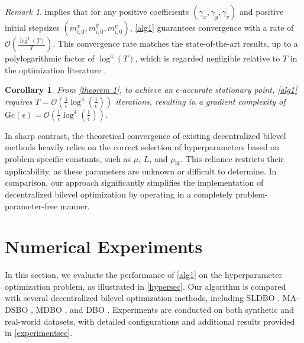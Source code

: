 \documentclass{article}
\theoremstyle{plain}
\newtheorem{corollary}[corollary]{Corollary}
\theoremstyle{definition}
\theoremstyle{remark}
\newtheorem{remark}[remark]{Remark}
\begin{document}
\begin{remark}
 implies that for any positive coefficients \((\gamma_x, \gamma_y, \gamma_v)\) and positive initial stepsizes \((m^x_{i,0}, m^y_{i,0}, m^v_{i,0})\), \cref{alg1} guarantees convergence with a rate of \(\mathcal{O}\left(\frac{\log^4(T)}{T}\right)\). This convergence rate matches the state-of-the-art results, up to a polylogarithmic factor of \(\log^4(T)\), which is regarded negligible relative to \(T\) in the optimization literature \citep{yang2022nest,li2024problem}.  
\end{remark}

\begin{corollary}\label{collary1}
From \cref{theorem 1}, to achieve an \(\epsilon\)-accurate stationary point, \cref{alg1} requires \(T = \mathcal{O}\left(\frac{1}{\epsilon} \log^4\left(\frac{1}{\epsilon}\right)\right)\) iterations, resulting in a gradient complexity of \(\mathrm{Gc}(\epsilon) = \mathcal{O}\left(\frac{1}{\epsilon} \log^4\left(\frac{1}{\epsilon}\right)\right)\).
\end{corollary}
\vspace{-0.19cm}

In sharp contrast, the theoretical convergence of existing decentralized bilevel methods heavily relies on the correct selection of hyperparameters based on problem-specific constants, such as \(\mu\), \(L\), and \(\rho_W\). This reliance restricts their applicability, as these parameters are unknown or difficult to determine. In comparison, our approach significantly simplifies the implementation of decentralized bilevel optimization by operating in a completely problem-parameter-free manner.

\vspace{-0.2cm}
\section{Numerical Experiments}
\vspace{-0.2cm}
In this section, we evaluate the performance of \cref{alg1} on the hyperparameter optimization problem, as illustrated in \cref{hypersec}.
Our algorithm is compared with several decentralized bilevel optimization methods, including SLDBO \citep{dong2023single}, MA-DSBO \citep{chen2023decentralized}, MDBO \citep{gao2023convergence}, and DBO \citep{chen2024decentralized}. Experiments are conducted on both synthetic and real-world datasets, with detailed configurations and additional results provided in \cref{experimentsec}.
\end{document}
